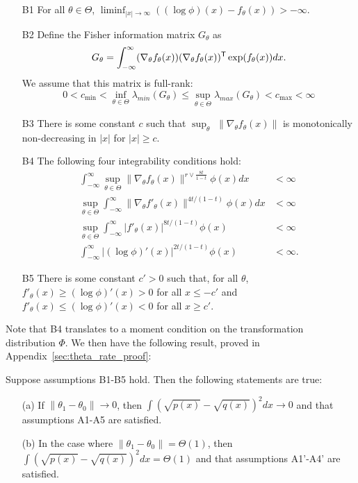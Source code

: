 \documentclass{article}
\begin{document}
{
\begin{enumerate}
\item[B1] For all $\theta \in \Theta$, $\liminf_{|x| \rightarrow \infty} \left( (\log \phi)(x) - f_\theta(x) \right) > -\infty$. 
\item[B2] Define the Fisher information matrix $G_\theta$ as
$$G_{\theta} = \int_{-\infty}^{\infty} (\nabla_{\theta} f_{\theta}(x)) 
                                    (\nabla_{\theta} f_{\theta}(x))^{\mathsf{T}} 
                      \exp( f_{\theta}(x)) dx.$$
 We assume that this matrix is full-rank:
   \[
 0<   c_{\min} <  \inf_{\theta \in \Theta} \lambda_{min}(G_\theta) \leq \sup_{\theta \in \Theta} \lambda_{max}(G_{\theta}) < c_{\max} < \infty
  \]
\item[B3] There is some constant $c$ such that $\sup_\theta$ $\| \nabla_{\theta} f_{\theta} (x) \|$ is monotonically non-decreasing in $|x|$ for $|x| \geq c$.
\item[B4] The following four integrability conditions hold:
  \begin{align*}
  \int_{-\infty}^\infty \sup_{\theta \in \Theta} \| \nabla_{\theta} f_\theta(x) \|^{r \vee \frac{8t}{1-t}} \phi(x) dx &< \infty\\
   \sup_{\theta \in \Theta} \int_{-\infty}^\infty \| \nabla_{\theta} f'_\theta(x) \|^{4t/(1-t)} \phi(x) dx &< \infty\\
  \sup_{\theta \in \Theta} \int_{-\infty}^\infty | f'_{\theta}(x) |^{8t/(1-t)} \phi(x) &< \infty   \\
        \int_{-\infty}^\infty | (\log \phi)'(x) |^{2t/(1-t)} \phi(x) &< \infty.  
  \end{align*}
\item[B5] There is some constant $c' > 0$ such that, for all $\theta$, $f'_\theta(x) \geq (\log \phi)'(x) > 0$ for all $x \leq -c'$ and 
          $f'_\theta(x) \leq (\log \phi)'(x) < 0$ for all $x \geq c'$.
\end{enumerate}
}
Note that B4 translates to a moment condition on the transformation distribution $\Phi$. We then have the following result, proved in Appendix~\ref{sec:theta_rate_proof}:
\begin{proposition}
\label{prop:theta_rate}
Suppose assumptions B1-B5 hold. Then the following statements are true:
\begin{enumerate}
\item[(a)] If $\| \theta_1 - \theta_0 \| \rightarrow 0$, then $\int (\sqrt{p(x)} - \sqrt{q(x)})^2 dx \rightarrow 0$ and that assumptions A1-A5 are satisfied. 
\item[(b)] In the case where $\| \theta_1 - \theta_0\| = \Theta(1)$, then $\int (\sqrt{p(x)} - \sqrt{q(x)})^2 dx = \Theta(1)$ and that assumptions A1'-A4' are satisfied.
\end{enumerate}
\end{proposition}
\end{document}
